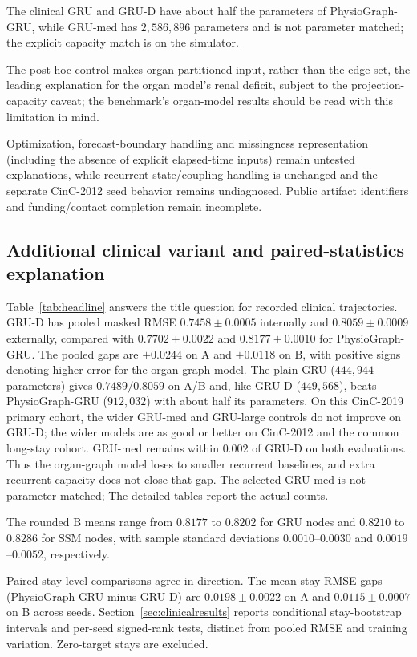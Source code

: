 The clinical GRU and GRU-D have about half the parameters of PhysioGraph-GRU, while GRU-med has $2{,}586{,}896$ parameters and is not parameter matched; the explicit capacity match is on the simulator.

The post-hoc control makes organ-partitioned input, rather than the edge set, the leading explanation for the organ model's renal deficit, subject to the projection-capacity caveat; the benchmark's organ-model results should be read with this limitation in mind.

Optimization, forecast-boundary handling and missingness representation (including the absence of explicit elapsed-time inputs) remain untested explanations, while recurrent-state/coupling handling is unchanged and the separate CinC-2012 seed behavior remains undiagnosed. Public artifact identifiers and funding/contact completion remain incomplete.

\subsection{Additional clinical variant and paired-statistics explanation}
Table~\ref{tab:headline} answers the title question for recorded clinical trajectories. GRU-D has pooled masked RMSE $0.7458\pm0.0005$ internally and $0.8059\pm0.0009$ externally, compared with $0.7702\pm0.0022$ and $0.8177\pm0.0010$ for PhysioGraph-GRU. The pooled gaps are $+0.0244$ on A and $+0.0118$ on B, with positive signs denoting higher error for the organ-graph model. The plain GRU ($444{,}944$ parameters) gives $0.7489/0.8059$ on A/B and, like GRU-D ($449{,}568$), beats PhysioGraph-GRU ($912{,}032$) with about half its parameters. On this CinC-2019 primary cohort, the wider GRU-med and GRU-large controls do not improve on GRU-D; the wider models are as good or better on CinC-2012 and the common long-stay cohort. GRU-med remains within $0.002$ of GRU-D on both evaluations. Thus the organ-graph model loses to smaller recurrent baselines, and extra recurrent capacity does not close that gap. The selected GRU-med is not parameter matched; The detailed tables report the actual counts.

The rounded B means range from $0.8177$ to $0.8202$ for GRU nodes and $0.8210$ to $0.8286$ for SSM nodes, with sample standard deviations $0.0010$--$0.0030$ and $0.0019$--$0.0052$, respectively.


Paired stay-level comparisons agree in direction. The mean stay-RMSE gaps (PhysioGraph-GRU minus GRU-D) are $0.0198\pm0.0022$ on A and $0.0115\pm0.0007$ on B across seeds. Section~\ref{sec:clinicalresults} reports conditional stay-bootstrap intervals and per-seed signed-rank tests, distinct from pooled RMSE and training variation. Zero-target stays are excluded.


